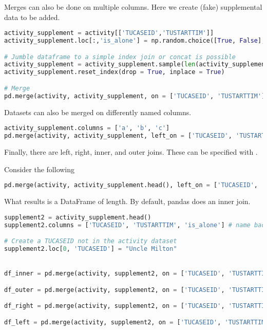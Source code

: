 Merges can also be done on multiple columns. Here we create (fake) supplemental data to be added.

\begin{lstlisting}[language = Python]
activity_supplement = activity[['TUCASEID','TUSTARTTIM']]
activity_supplement.loc[:,'is_alone'] = np.random.choice([True, False],len(activity_supplement))

# Jumble dataframe to a simple index join or concat is possible
activity_supplement = activity_supplement.sample(len(activity_supplement)) # samples without replacement to shuffle
activity_supplement.reset_index(drop = True, inplace = True)

# Merge
pd.merge(activity, activity_supplement, on = ['TUCASEID', 'TUSTARTTIM'], validate = 'one_to_one')
\end{lstlisting}

Datasets can also be merged on differently named columns.

\begin{lstlisting}[language = Python]
activity_supplement.columns = ['a', 'b', 'c']
pd.merge(activity, activity_supplement, left_on = ['TUCASEID', 'TUSTARTTIM'], right_on = ['a','b'])
\end{lstlisting}


Finally, there are left, right, inner, and outer joins. These can be specified with . 

Consider the following

\begin{lstlisting}[language = Python]
pd.merge(activity, activity_supplement.head(), left_on = ['TUCASEID', 'TUSTARTTIM'], right_on = ['a','b'])
\end{lstlisting}

What results is a DataFrame of length. By default, pandas does an inner join.

\begin{lstlisting}[language = Python]
supplement2 = activity_supplement.head()
supplement2.columns = ['TUCASEID', 'TUSTARTTIM', 'is_alone'] # name back

# Create a TUCASEID not in the activity dataset
supplement2.loc[0, 'TUCASEID'] = "Uncle Milton"


df_inner = pd.merge(activity, supplement2, on = ['TUCASEID', 'TUSTARTTIM'],  how = 'inner')

df_outer = pd.merge(activity, supplement2, on = ['TUCASEID', 'TUSTARTTIM'], how = 'outer')

df_right = pd.merge(activity, supplement2, on = ['TUCASEID', 'TUSTARTTIM'], how = 'right')

df_left = pd.merge(activity, supplement2, on = ['TUCASEID', 'TUSTARTTIM'], how = 'left')
\end{lstlisting}

